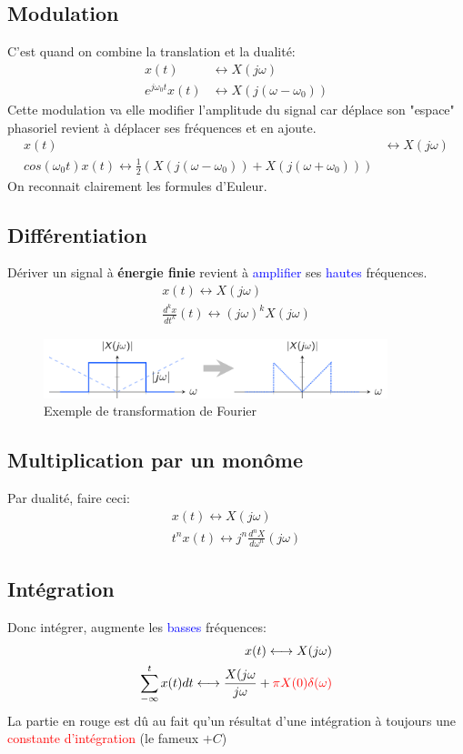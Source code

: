 \documentclass{report}
\begin{document}
\subsection{Modulation}
C'est quand on combine la translation et la dualité:
\begin{align*}
x(t) & \longleftrightarrow X(j\omega)\\
e^{j\omega_0 t}x(t) & \longleftrightarrow X(j(\omega - \omega_0))
\end{align*}
Cette modulation va elle modifier l'amplitude du signal car déplace son "espace" phasoriel revient à déplacer ses fréquences et en ajoute.
\begin{align*}
x(t) & \longleftrightarrow X(j\omega)\\
cos(\omega_0 t)x(t) \longleftrightarrow \frac{1}{2}(X(j(\omega - \omega_0)) + X(j(\omega + \omega_0))) 
\end{align*}
On reconnait clairement les formules d'Euleur.

\subsection{Différentiation}
Dériver un signal à \textbf{énergie finie} revient à \textcolor{blue}{amplifier} ses \textcolor{blue}{hautes} fréquences.
\begin{align*}
x(t) \longleftrightarrow X(j\omega)\\
\frac{d^kx}{dt^k}(t) \longleftrightarrow (j\omega)^kX(j\omega)
\end{align*}
\begin{figure}[H]
\centering
\includegraphics[width=10cm]{img/diff.png}
\caption{Exemple de transformation de Fourier}
\end{figure}

\subsection{Multiplication par un monôme}
Par dualité, faire ceci:
\begin{align*}
x(t) \longleftrightarrow X(j\omega)\\
t^nx(t) \longleftrightarrow j^n \frac{d^nX}{d\omega^n} (j\omega)
\end{align*}
\subsection{Intégration}
Donc intégrer, augmente les \textcolor{blue}{basses} fréquences:
\begin{align*}
x(t) \longleftrightarrow X(j\omega)\\
\sum_{-\infty}^t	x(t)dt \longleftrightarrow \frac{X(j\omega}{j\omega} + \textcolor{red}{\pi X(0) \delta(\omega)}
\end{align*}
La partie en rouge est dû au fait qu'un résultat d'une intégration à toujours une \textcolor{red}{constante d'intégration} (le fameux $+C$)
\end{document}
